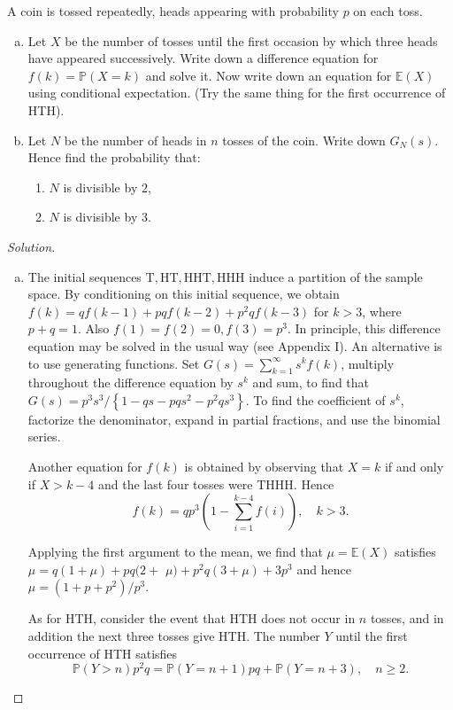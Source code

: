 \documentclass[11pt,singlecolumn, openany, citestyle=authoryear]{elegantbook}
\begin{document}
\begin{CJK}{UTF8}{gbsn}
\begin{exercise}
    A coin is tossed repeatedly, heads appearing with probability $p$ on each toss.
\begin{enumerate}[(a)]
    \item Let $X$ be the number of tosses until the first occasion by which three heads have appeared successively. Write down a difference equation for $f(k)=\mathbb{P}(X=k)$ and solve it. Now write down an equation for $\mathbb{E}(X)$ using conditional expectation. (Try the same thing for the first occurrence of HTH).
    \item Let $N$ be the number of heads in $n$ tosses of the coin. Write down $G_N(s)$. Hence find the probability that:
    \begin{enumerate}[(1)]
    \item $N$ is divisible by $2$,
    \item $N$ is divisible by $3$.
    \end{enumerate}
\end{enumerate}
\end{exercise}
\begin{proof}[Solution]
    \begin{enumerate}[(a)]
        \item The initial sequences $\mathrm{T}, \mathrm{HT}, \mathrm{HHT}, \mathrm{HHH}$ induce a partition of the sample space. By conditioning on this initial sequence, we obtain $f(k)=q f(k-1)+p q f(k-2)+p^2 q f(k-3)$ for $k>3$, where $p+q=1$. Also $f(1)=f(2)=0, f(3)=p^3$. In principle, this difference equation may be solved in the usual way (see Appendix I). An alternative is to use generating functions. Set $G(s)=\sum_{k=1}^{\infty} s^k f(k)$, multiply throughout the difference equation by $s^k$ and sum, to find that $G(s)=p^3 s^3 /\left\{1-q s-p q s^2-p^2 q s^3\right\}$. To find the coefficient of $s^k$, factorize the denominator, expand in partial fractions, and use the binomial series.

        Another equation for $f(k)$ is obtained by observing that $X=k$ if and only if $X>k-4$ and the last four tosses were THHH. Hence
        $$
        f(k)=q p^3\left(1-\sum_{i=1}^{k-4} f(i)\right), \quad k>3 .
        $$
        
        Applying the first argument to the mean, we find that $\mu=\mathbb{E}(X)$ satisfies $\mu=q(1+\mu)+p q(2+$ $\mu)+p^2 q(3+\mu)+3 p^3$ and hence $\mu=\left(1+p+p^2\right) / p^3$.
        
        As for HTH, consider the event that HTH does not occur in $n$ tosses, and in addition the next three tosses give HTH. The number $Y$ until the first occurrence of HTH satisfies
        $$
        \mathbb{P}(Y>n) p^2 q=\mathbb{P}(Y=n+1) p q+\mathbb{P}(Y=n+3), \quad n \geq 2 .
        $$
        

\end{enumerate}
\end{proof}
\end{CJK}
\end{document}

